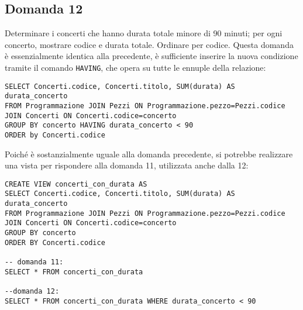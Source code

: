 \documentclass{article}
\numberwithin{equation}{subsection}
\begin{document}
\subsection*{Domanda 12}
Determinare i concerti che hanno durata totale minore di 90 minuti; per ogni concerto, mostrare codice e durata totale. Ordinare per codice. Questa domanda è essenzialmente identica alla precedente, è 
sufficiente inserire la nuova condizione tramite il comando \verb|HAVING|, che opera su tutte le ennuple della relazione: 
\begin{verbatim}
SELECT Concerti.codice, Concerti.titolo, SUM(durata) AS durata_concerto
FROM Programmazione JOIN Pezzi ON Programmazione.pezzo=Pezzi.codice
JOIN Concerti ON Concerti.codice=concerto
GROUP BY concerto HAVING durata_concerto < 90
ORDER by Concerti.codice
\end{verbatim}
Poiché è sostanzialmente uguale alla domanda precedente, si potrebbe realizzare una vista per rispondere alla domanda 11, utilizzata anche dalla 12:
\begin{verbatim}
CREATE VIEW concerti_con_durata AS
SELECT Concerti.codice, Concerti.titolo, SUM(durata) AS durata_concerto
FROM Programmazione JOIN Pezzi ON Programmazione.pezzo=Pezzi.codice
JOIN Concerti ON Concerti.codice=concerto
GROUP BY concerto
ORDER BY Concerti.codice

-- domanda 11:
SELECT * FROM concerti_con_durata

--domanda 12:
SELECT * FROM concerti_con_durata WHERE durata_concerto < 90
\end{verbatim}
\end{document}
